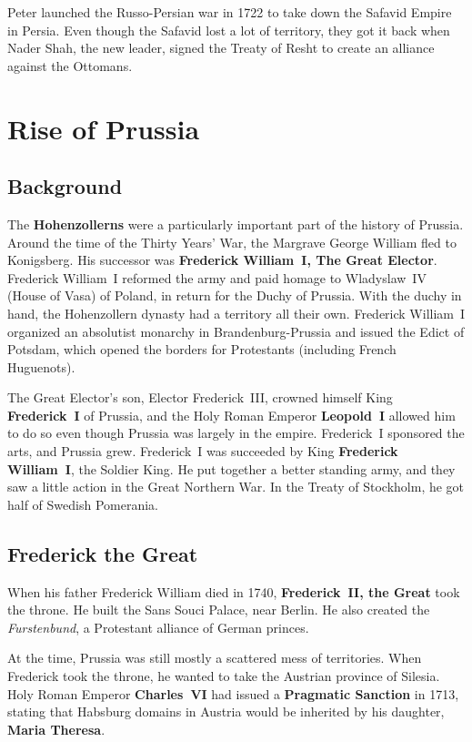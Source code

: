 Peter launched the Russo-Persian war in 1722 to take down the Safavid Empire in Persia.
Even though the Safavid lost a lot of territory,
they got it back when Nader Shah, the new leader,
signed the Treaty of Resht to create an alliance against the Ottomans.

\section{Rise of Prussia}

\subsection*{Background}

The \textbf{Hohenzollerns} were a particularly important part of the history of Prussia.
Around the time of the Thirty Years' War, the Margrave George William fled to Konigsberg.
His successor was \textbf{Frederick William~I, The Great Elector}.
Frederick William~I reformed the army and paid homage to Wladyslaw~IV (House of Vasa) of Poland,
in return for the Duchy of Prussia.
With the duchy in hand, the Hohenzollern dynasty had a territory all their own.
Frederick William~I organized an absolutist monarchy in Brandenburg-Prussia
and issued the Edict of Potsdam,
which opened the borders for Protestants (including French Huguenots).

The Great Elector's son, Elector Frederick~III,
crowned himself King \textbf{Frederick~I} of Prussia,
and the Holy Roman Emperor \textbf{Leopold~I}
allowed him to do so even though Prussia was largely in the empire.
Frederick~I sponsored the arts, and Prussia grew.
Frederick~I was succeeded by King \textbf{Frederick William~I}, the Soldier King.
He put together a better standing army, and they saw a little action in the Great Northern War.
In the Treaty of Stockholm, he got half of Swedish Pomerania.

\subsection*{Frederick the Great}

When his father Frederick William died in 1740, \textbf{Frederick~II, the Great} took the throne.
He built the Sans Souci Palace, near Berlin.
He also created the \textit{Furstenbund}, a Protestant alliance of German princes.

At the time, Prussia was still mostly a scattered mess of territories.
When Frederick took the throne, he wanted to take the Austrian province of Silesia.
Holy Roman Emperor \textbf{Charles~VI} had issued a \textbf{Pragmatic Sanction} in 1713,
stating that Habsburg domains in Austria would be inherited by his daughter, \textbf{Maria Theresa}.

